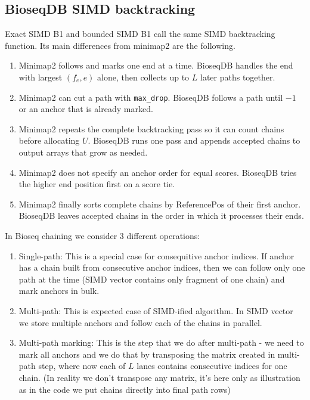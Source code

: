 \subsection{BioseqDB SIMD backtracking}

Exact SIMD B1 and bounded SIMD B1 call the same SIMD backtracking function.
Its main differences from minimap2 are the following.

\begin{enumerate}
  \item Minimap2 follows and marks one end at a time. BioseqDB handles the end
        with largest \((f_e,e)\) alone, then collects up to \(L\) later paths
        together.
  \item Minimap2 can cut a path with \texttt{max\_drop}. BioseqDB follows a
        path until \(-1\) or an anchor that is already marked.
  \item Minimap2 repeats the complete backtracking pass so it can count chains
        before allocating \(U\). BioseqDB runs one pass and appends accepted
        chains to output arrays that grow as needed.
  \item Minimap2 does not specify an anchor order for equal scores.
        BioseqDB tries the higher end position first on a score tie.
  \item Minimap2 finally sorts complete chains by $\text{ReferencePos}$ of their first
        anchor.
        BioseqDB leaves accepted chains in the order in which it processes
        their ends.
\end{enumerate}

In Bioseq chaining we consider 3 different operations:
\begin{enumerate}
  \item Single-path: This is a special case for consequitive anchor indices. If anchor has a chain built from consecutive anchor indices, then we can follow only one path at the time (SIMD vector contains only fragment of one chain) and mark anchors in bulk.
  \item Multi-path: This is expected case of SIMD-ified algorithm. In SIMD vector we store multiple anchors and follow each of the chains in parallel.
  \item Multi-path marking: This is the step that we do after multi-path - we need to mark all anchors and we do that by transposing the matrix created in multi-path step, where now each of $L$ lanes contains consecutive indices for one chain. (In reality we don't transpose any matrix, it's here only as illustration as in the code we put chains directly into final path rows)
\end{enumerate}

